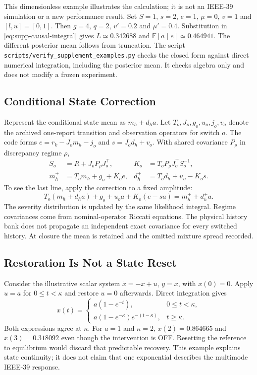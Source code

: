 This dimensionless example illustrates the calculation; it is not an
IEEE-39 simulation or a new performance result. Set
$S=1$, $s=2$, $e=1$, $\mu=0$, $v=1$ and $[l,u]=[0,1]$.
Then $g=4$, $q=2$, $v'=0.2$ and $\mu'=0.4$. Substitution in
\eqref{eq:supp-causal-integral} gives
$L\simeq0.342688$ and
$\mathbb E[a\mid e]\simeq0.464941$.
The different posterior mean follows from truncation.
The script \nolinkurl{scripts/verify_supplement_examples.py} checks the
closed form against direct numerical integration, including the posterior
mean. It checks algebra only and does not modify a frozen experiment.\AIDraftingCredit{}

\subsection{Conditional State Correction}
\label{sec:supp-causal-state}

Represent the conditional state mean as $m_h+d_h a$. Let
$T_o,J_o,g_o,u_o,j_o,v_o$ denote the archived one-report transition and
observation operators for switch $o$. The code forms
$e=r_k-J_o m_h-j_o$ and $s=J_o d_h+v_o$. With shared covariance
$P_\rho$ in discrepancy regime $\rho$,
\begin{align}
 S_o&=R+J_oP_\rho J_o^\top,&
 K_o&=T_oP_\rho J_o^\top S_o^{-1},\nonumber\\
 m_h^+&=T_o m_h+g_o+K_o e,&
 d_h^+&=T_o d_h+u_o-K_o s.
 \label{eq:implemented-conditional-correction}
\end{align}
To see the last line, apply the correction to a fixed amplitude:
\[
 T_o(m_h+d_h a)+g_o+u_o a+K_o(e-sa)
     =m_h^++d_h^+a.
\]
The severity distribution is updated by the same likelihood integral.
Regime covariances come from nominal-operator Riccati equations. The physical history bank does
not propagate an independent exact covariance for every switched history.
At closure the mean is retained and the omitted mixture spread recorded.

\subsection{Restoration Is Not a State Reset}

Consider the illustrative scalar system
$\dot x=-x+u$, $y=x$, with $x(0)=0$. Apply $u=a$ for
$0\le t<\kappa$ and restore $u=0$ afterwards. Direct integration gives
\begin{equation}
 x(t)=\begin{cases}
 a(1-e^{-t}),&0\le t<\kappa,\\
 a(1-e^{-\kappa})e^{-(t-\kappa)},&t\ge\kappa.
 \end{cases}
\end{equation}
Both expressions agree at $\kappa$. For $a=1$ and $\kappa=2$,
$x(2)=0.864665$ and $x(3)=0.318092$ even though the intervention is OFF.
Resetting the reference to equilibrium would discard that predictable
recovery. This example explains state continuity; it does not claim that
one exponential describes the multimode IEEE-39 response.

